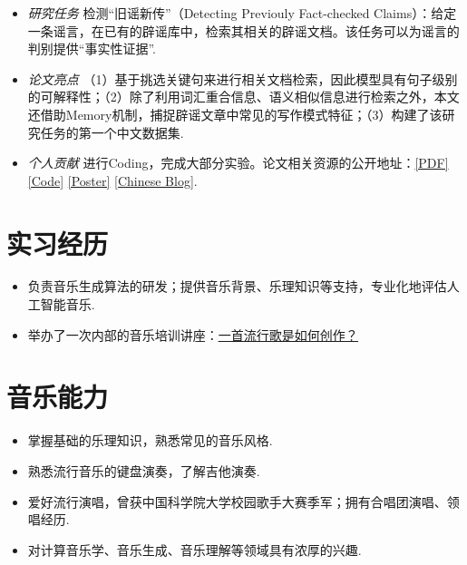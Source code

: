 \documentclass{resume}
\begin{document}
{\small {}}
\small
\begin{itemize}
  \item \textit{研究任务} \quad 检测“旧谣新传”（Detecting Previouly Fact-checked Claims）：给定一条谣言，在已有的辟谣库中，检索其相关的辟谣文档。该任务可以为谣言的判别提供“事实性证据”.
  \item \textit{论文亮点} \quad （1）基于挑选关键句来进行相关文档检索，因此模型具有句子级别的可解释性；（2）除了利用词汇重合信息、语义相似信息进行检索之外，本文还借助Memory机制，捕捉辟谣文章中常见的写作模式特征；（3）构建了该研究任务的第一个中文数据集.
  \item \textit{个人贡献} \quad 进行Coding，完成大部分实验。论文相关资源的公开地址：\href{https://aclanthology.org/2021.acl-long.425.pdf}{[PDF]} \href{https://github.com/ICTMCG/MTM}{[Code]} \href{https://www.zhangxueyao.com/data/acl2021-MTM-poster.pdf}{[Poster]} \href{https://zhuanlan.zhihu.com/p/393615707}{[Chinese Blog]}.
\end{itemize}

\section{实习经历}
{\small {}
}
\small
\begin{itemize}
  \item 负责音乐生成算法的研发；提供音乐背景、乐理知识等支持，专业化地评估人工智能音乐.
  \item 举办了一次内部的音乐培训讲座：\href{https://www.zhangxueyao.com/data/wcpr-pop-music.pdf}{\underline{一首流行歌是如何创作？}}
\end{itemize}

\section{音乐能力}
\small
\begin{itemize}
  \item 掌握基础的乐理知识，熟悉常见的音乐风格.
  \item 熟悉流行音乐的键盘演奏，了解吉他演奏.
  \item 爱好流行演唱，曾获中国科学院大学校园歌手大赛季军；拥有合唱团演唱、领唱经历.
  \item 对计算音乐学、音乐生成、音乐理解等领域具有浓厚的兴趣. 
\end{itemize}
\end{document}
